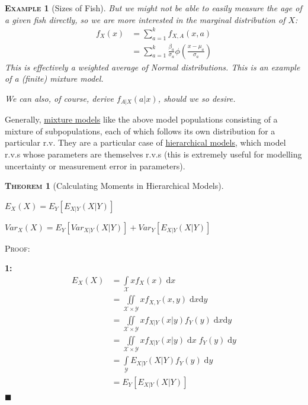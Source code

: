 \documentclass[12pt,a4paper]{article}
\newtheorem{example}{\textsc{Example}}[section]
\newtheorem{theorem}{\textsc{Theorem}}[section]
\newcommand{\diff}{\mathrm{d}}
\begin{document}
\begin{example}[Sizes of Fish]
But we might not be able to easily measure the age of a given fish directly, so we are more interested in the marginal distribution of $X$:
\begin{align*}
f_X(x) &= \sum_{a=1}^k f_{X,A}(x,a)\\
&= \sum_{a=1}^k \frac{\beta_a}{\sigma_a} \phi\left(\frac{x-\mu_a}{\sigma_a}\right)
\end{align*}
This is effectively a weighted average of Normal distributions. This is an example of a (finite) mixture model.

We can also, of course, derive $f_{A|X}(a|x)$, should we so desire.

\end{example}

Generally, \underline{mixture models} like the above model populations consisting of a mixture of subpopulations, each of which follows its own distribution for a particular r.v. They are a particular case of \underline{hierarchical models}, which model r.v.s whose parameters are themselves r.v.s (this is extremely useful for modelling uncertainty or measurement error in parameters).

\begin{theorem}[Calculating Moments in Hierarchical Models]\label{iterated expectation}$\;$\par\vspace{1cm}

 $E_{X}(X) = E_{Y}[E_{{X|Y}}(X|Y)]$

 $Var_{X}(X) = E_{Y}[Var_{{X|Y}}(X|Y)] + Var_{Y}[E_{{X|Y}}(X|Y)]$

\end{theorem}

\noindent\textsc{Proof:}\par\vspace{1cm}

{\bf1: }
\begin{align*}
E_{X}(X) &= \int\limits_{\mathcal{X}}\!\! xf_X(x)\;\diff x\\
&= \iint\limits_{\mathcal{X}\times\mathcal{Y}}\!\! xf_{X,Y}(x,y)\;\diff x \diff y\\
&= \iint\limits_{\mathcal{X}\times\mathcal{Y}}\!\! xf_{X|Y}(x|y) f_Y(y)\; \diff x \diff y\\
&= \iint\limits_{\mathcal{X}\times\mathcal{Y}}\!\! xf_{X|Y}(x|y)\;\diff x\; f_Y(y)\; \diff y\\
&= \int\limits_{\mathcal{Y}}\!\! E_{{X|Y}}(X|Y) f_Y(y)\; \diff y\\
&= E_{Y}[E_{X|Y}(X|Y)]
\end{align*} \hfill$\blacksquare$
\end{document}

